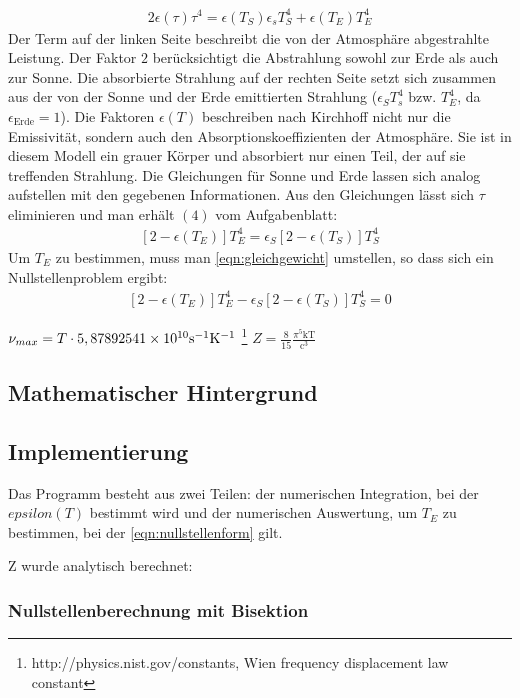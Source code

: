\documentclass[10pt,a4paper]{article}
\begin{document}
\begin{align}
2\epsilon(\tau)\tau^4=\epsilon(T_S)\epsilon_s T_S^4+\epsilon(T_E)T_E^4
\end{align}
Der Term auf der linken Seite beschreibt die von der Atmosphäre abgestrahlte Leistung. Der Faktor $2$ berücksichtigt die Abstrahlung sowohl zur Erde als auch zur Sonne. Die absorbierte Strahlung auf der rechten Seite setzt sich zusammen aus der von der Sonne und der Erde emittierten Strahlung ($\epsilon_S T_s^4$ bzw. $T_E^4$, da $\epsilon_{\mathrm{Erde}}=1$). Die Faktoren $\epsilon(T)$ beschreiben nach Kirchhoff nicht nur die Emissivität, sondern auch den Absorptionskoeffizienten der Atmosphäre. Sie ist in diesem Modell ein grauer Körper und absorbiert nur einen Teil, der auf sie treffenden Strahlung. Die Gleichungen für Sonne und Erde lassen sich analog aufstellen mit den gegebenen Informationen.
Aus den Gleichungen lässt sich $\tau$ eliminieren und man erhält $(4)$ vom Aufgabenblatt:
\begin{align}
\left[2-\epsilon(T_E)\right]T_E^4=\epsilon_S\left[2-\epsilon(T_S)\right]T_S^4
\label{eqn:gleichgewicht}
\end{align}
Um $T_E$ zu bestimmen, muss man \ref{eqn:gleichgewicht} umstellen, so dass sich ein Nullstellenproblem ergibt:
\begin{align}
\left[2-\epsilon(T_E)\right]T_E^4-\epsilon_S\left[2-\epsilon(T_S)\right]T_S^4=0
\label{eqn:nullstellenform}
\end{align}


$\nu_{max}=T\cdot 5,8789254\num{1E10}\si{\per\second}\si{\per\kelvin}$ \footnote{http://physics.nist.gov/constants, Wien frequency displacement law constant}
$Z=\frac{8}{15}\frac{\pi^5 \mathrm{kT}}{\mathrm{c}^3}$

\subsection{Mathematischer Hintergrund}

\subsection{Implementierung}

Das Programm besteht aus zwei Teilen: der numerischen Integration, bei der $epsilon(T)$ bestimmt wird und der numerischen Auswertung, um $T_E$ zu bestimmen, bei der \ref{eqn:nullstellenform} gilt.

Z wurde analytisch berechnet: 

\subsubsection{Nullstellenberechnung mit Bisektion}
\end{document}
